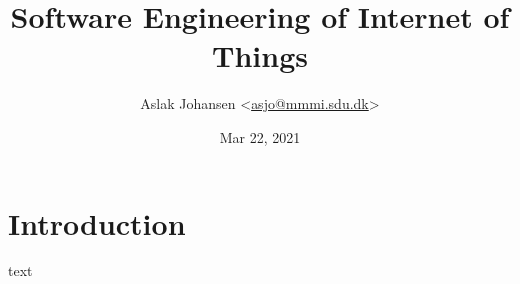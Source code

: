 \documentclass[a4paper]{article}
\begin{document}
\title{Software Engineering of Internet of Things\\\scalebox{.85}{Handin 0: Sampling Rate}}
\author{Aslak Johansen <\href{mailto:asjo@mmmi.sdu.dk}{asjo@mmmi.sdu.dk}>}
\date{Mar 22, 2021}
\maketitle
\vspace{5mm}

\section{Introduction}

text
\end{document}
